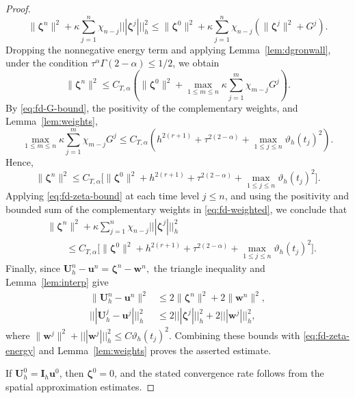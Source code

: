 \documentclass[11pt,a4paper]{article}
\numberwithin{equation}{section}
\theoremstyle{plain}
\theoremstyle{definition}
\theoremstyle{remark}
\newcommand{\nrm}[1]{|||#1|||_h}      %
\begin{document}
\begin{proof}
\begin{equation}
\|\bm\zeta^n\|^2
+\kappa\sum_{j=1}^n
\chi_{n-j}\nrm{\bm\zeta^j}^2\le
\|\bm\zeta^0\|^2
+\kappa\sum_{j=1}^n
\chi_{n-j}
\left(\|\bm\zeta^j\|^2+G^j\right).
\end{equation}
%
Dropping the nonnegative energy term
and applying Lemma~\ref{lem:dgronwall},
under the condition
$\tau^\alpha\Gamma(2-\alpha)\le1/2$,
we obtain
\begin{equation}\label{eq:fd-zeta-L2}
\|\bm\zeta^n\|^2
\le C_{T,\alpha}
\left(
\|\bm\zeta^0\|^2
+\max_{1\le m\le n}
\kappa\sum_{j=1}^m
\chi_{m-j}G^j
\right).
\end{equation}
%
By \eqref{eq:fd-G-bound}, the positivity
of the complementary weights, and
Lemma~\ref{lem:weights},
\[
\max_{1\le m\le n}
\kappa\sum_{j=1}^m\chi_{m-j}G^j
\le C_{T,\alpha}
\left(
h^{2(r+1)}
+\tau^{2(2-\alpha)}
+\max_{1\le j\le n}\vartheta_h(t_j)^2
\right).
\]
Hence,
\begin{equation}\label{eq:fd-zeta-bound}
\|\bm\zeta^n\|^2
\le C_{T,\alpha}\bigg[
\|\bm\zeta^0\|^2
+h^{2(r+1)}
+\tau^{2(2-\alpha)}
+\max_{1\le j\le n}
\vartheta_h(t_j)^2
\bigg].
\end{equation}
%
Applying \eqref{eq:fd-zeta-bound}
at each time level $j\le n$,
and using the positivity and bounded sum
of the complementary weights in
\eqref{eq:fd-weighted}, we conclude that
\begin{equation}\label{eq:fd-zeta-energy}
\begin{aligned}
&\|\bm\zeta^n\|^2
+\kappa\sum_{j=1}^n
\chi_{n-j}\nrm{\bm\zeta^j}^2\\
&\qquad\le C_{T,\alpha}\bigg[
\|\bm\zeta^0\|^2
+h^{2(r+1)}
+\tau^{2(2-\alpha)}
+\max_{1\le j\le n}
\vartheta_h(t_j)^2
\bigg].
\end{aligned}
\end{equation}
%
Finally, since
$
\bm U_h^n-\bm u^n
=\bm\zeta^n-\bm w^n,
$
the triangle inequality and
Lemma~\ref{lem:interp} give
\[
\begin{aligned}
\|\bm U_h^n-\bm u^n\|^2
&\le
2\|\bm\zeta^n\|^2+2\|\bm w^n\|^2,\\
\nrm{\bm U_h^j-\bm u^j}^2
&\le
2\nrm{\bm\zeta^j}^2
+2\nrm{\bm w^j}^2,
\end{aligned}
\]
where
$
\|\bm w^j\|^2+\nrm{\bm w^j}^2
\le C\vartheta_h(t_j)^2.
$
Combining these bounds with
\eqref{eq:fd-zeta-energy} and
Lemma~\ref{lem:weights}
proves the asserted estimate.

If $\bm U_h^0=\bm I_h\bm u^0$,
then $\bm\zeta^0=0$, and the stated
convergence rate follows from the
spatial approximation estimates.
\end{proof}
\end{document}
